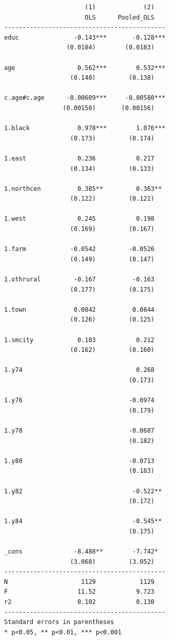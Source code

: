 \documentclass[
]{book}
\begin{document}
\begin{verbatim}
                      (1)             (2)   
                      OLS      Pooled_OLS   
--------------------------------------------
educ               -0.143***       -0.128***
                 (0.0184)        (0.0183)   

age                 0.562***        0.532***
                  (0.140)         (0.138)   

c.age#c.age      -0.00609***     -0.00580***
                (0.00158)       (0.00156)   

1.black             0.978***        1.076***
                  (0.173)         (0.174)   

1.east              0.236           0.217   
                  (0.134)         (0.133)   

1.northcen          0.385**         0.363** 
                  (0.122)         (0.121)   

1.west              0.245           0.198   
                  (0.169)         (0.167)   

1.farm            -0.0542         -0.0526   
                  (0.149)         (0.147)   

1.othrural         -0.167          -0.163   
                  (0.177)         (0.175)   

1.town             0.0842          0.0844   
                  (0.126)         (0.125)   

1.smcity            0.183           0.212   
                  (0.162)         (0.160)   

1.y74                               0.268   
                                  (0.173)   

1.y76                             -0.0974   
                                  (0.179)   

1.y78                             -0.0687   
                                  (0.182)   

1.y80                             -0.0713   
                                  (0.183)   

1.y82                              -0.522** 
                                  (0.172)   

1.y84                              -0.545** 
                                  (0.175)   

_cons              -8.488**        -7.742*  
                  (3.068)         (3.052)   
--------------------------------------------
N                    1129            1129   
F                   11.52           9.723   
r2                  0.102           0.130   
--------------------------------------------
Standard errors in parentheses
* p<0.05, ** p<0.01, *** p<0.001
\end{verbatim}
\end{document}
